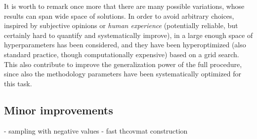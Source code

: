 It is worth to remark once more that there are many possible variations, whose
results can span wide space of solutions.
In order to avoid arbitrary choices, inspired by subjective opinions or
\textit{human experience} (potentially reliable, but certainly hard to quantify
and systematically improve), in  a large enough space of
hyperparameters has been considered, and they have been hyperoptimized (also
standard practice, though computationally expensive) based on a grid search.
%
This also contribute to improve the generalization power of the full procedure,
since also the methodology parameters have been systematically optimized for
this task.

\subsection{Minor improvements}

- sampling with negative values
- fast thcovmat construction
